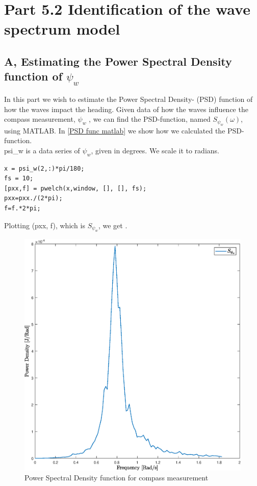 \newcommand{\texMacro}[2]{\texttt{\textbackslash{#1}\{#2\}}}
\section{Part 5.2 Identification of the wave spectrum model}
\subsection{A, Estimating the Power Spectral Density function of $\psi_w$}
In this part we wish to estimate the Power Spectral Density- (PSD) function of how the waves impact the heading.  
Given data of how the waves influence the compass measurement, $\psi_w$ , we can find the PSD-function, named $S_{\psi_w}(\omega)$, using MATLAB. In \cref{PSD func matlab} we show how we calculated the PSD-function.\\
psi\_w is a data series of $\psi_w$, given in degrees. We scale it to radians.  
\begin{lstlisting}[caption={Calculating Power Spectral Density function},label={PSD func matlab}]
x = psi_w(2,:)*pi/180;
fs = 10;
[pxx,f] = pwelch(x,window, [], [], fs);
pxx=pxx./(2*pi);
f=f.*2*pi;
\end{lstlisting} 
Plotting (pxx, f), which is  $S_{\psi_w}$, we get . 
\begin{figure}
    \centering
    \includegraphics[width=1.00\textwidth]{figures/plots/P5p2a_PSD.eps}
    \caption{Power Spectral Density function for compass measurement}
    \label{fig:Power Spectral density}
\end{figure}


